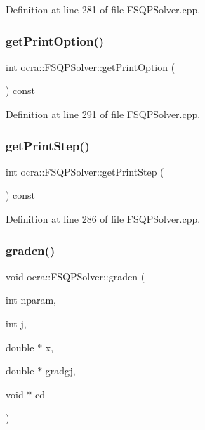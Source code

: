Definition at line 281 of file F\+S\+Q\+P\+Solver.\+cpp.

\hypertarget{classocra_1_1FSQPSolver_a1be56f4f2dba807d78869a5e18e2f467}{}\label{classocra_1_1FSQPSolver_a1be56f4f2dba807d78869a5e18e2f467} 
\subsubsection{\texorpdfstring{get\+Print\+Option()}{getPrintOption()}}
{\footnotesize\ttfamily int ocra\+::\+F\+S\+Q\+P\+Solver\+::get\+Print\+Option (\begin{DoxyParamCaption}{ }\end{DoxyParamCaption}) const}



Definition at line 291 of file F\+S\+Q\+P\+Solver.\+cpp.

\hypertarget{classocra_1_1FSQPSolver_a6ef85f729aa01a38d87da2ed98ee72c2}{}\label{classocra_1_1FSQPSolver_a6ef85f729aa01a38d87da2ed98ee72c2} 
\subsubsection{\texorpdfstring{get\+Print\+Step()}{getPrintStep()}}
{\footnotesize\ttfamily int ocra\+::\+F\+S\+Q\+P\+Solver\+::get\+Print\+Step (\begin{DoxyParamCaption}{ }\end{DoxyParamCaption}) const}



Definition at line 286 of file F\+S\+Q\+P\+Solver.\+cpp.

\hypertarget{classocra_1_1FSQPSolver_aea97ea5c3c2480976ad27c190b60077d}{}\label{classocra_1_1FSQPSolver_aea97ea5c3c2480976ad27c190b60077d} 
\subsubsection{\texorpdfstring{gradcn()}{gradcn()}}
{\footnotesize\ttfamily void ocra\+::\+F\+S\+Q\+P\+Solver\+::gradcn (\begin{DoxyParamCaption}\item[{int}]{nparam,  }\item[{int}]{j,  }\item[{double $\ast$}]{x,  }\item[{double $\ast$}]{gradgj,  }\item[{void $\ast$}]{cd }\end{DoxyParamCaption})\hspace{0.3cm}{\ttfamily [virtual]}}



